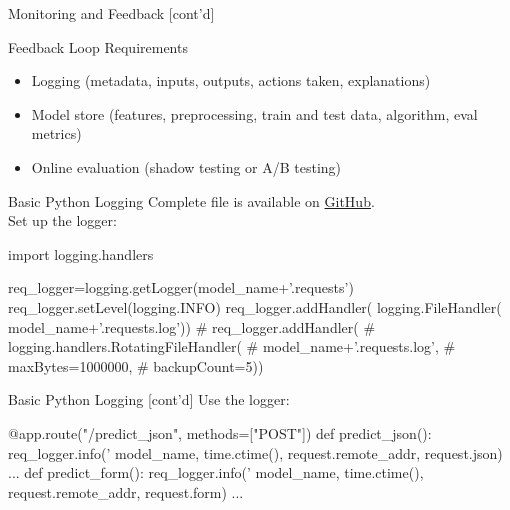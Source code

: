 \documentclass[ignorenonframetext,xcolor=x11names]{beamer}
\begin{document}
\begin{frame}[label=full]{Monitoring and Feedback \small [cont'd]}
\begin{block}{Feedback Loop Requirements}
\begin{itemize}
   \item Logging (metadata, inputs, outputs, actions taken, explanations)
   \item Model store (features, preprocessing, train and test data, algorithm, eval metrics)
   \item Online evaluation (shadow testing or A/B testing)
\end{itemize}
\end{block}
\end{frame}


\begin{frame}[label=withcode,fragile]{Basic Python Logging}
Complete file is available on \href{https://github.com/jevermann/busi4720-mlops/blob/main/flask_deploy_logging.py}{GitHub}. \\

Set up the logger:
\begin{pythoncode}
import logging.handlers

req_logger=logging.getLogger(model_name+'.requests')
req_logger.setLevel(logging.INFO)
req_logger.addHandler(
    logging.FileHandler(
        model_name+'.requests.log'))
# req_logger.addHandler(
#     logging.handlers.RotatingFileHandler(
#         model_name+'.requests.log',
#         maxBytes=1000000,
#         backupCount=5))
\end{pythoncode}
\end{frame}

\begin{frame}[label=withcode,fragile]{Basic Python Logging \small [cont'd]}
Use the logger:
\begin{pythoncode}
@app.route("/predict_json", methods=["POST"])
def predict_json():
    req_logger.info('%
                    model_name, 
                    time.ctime(), 
                    request.remote_addr, 
                    request.json)
...
def predict_form():
    req_logger.info('%
                    model_name,
                    time.ctime(),
                    request.remote_addr,
                    request.form)
...
\end{pythoncode}
\end{frame}
\end{document}
